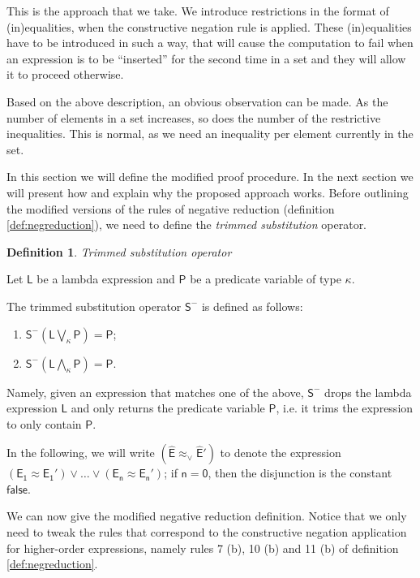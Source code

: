 \documentclass[inscr,ack,preface]{dithesis}
\theoremstyle{definition}
\newtheorem{definition}{Definition}[]
\newcommand{\msf}[1]{$\mathsf{#1}$}
\begin{document}
This is the approach that we take. We introduce restrictions in the format of (in)equalities, when the constructive negation rule is applied. These (in)equalities have to be introduced in such a way, that will cause the computation to fail when an expression is to be ``inserted'' for the second time in a set and they will allow it to proceed otherwise.

Based on the above description, an obvious observation can be made. As the number of elements in a set increases, so does the number of the restrictive inequalities. This is normal, as we need an inequality per element currently in the set.

In this section we will define the modified proof procedure. In the next section we will present how and explain why the proposed approach works. Before outlining the modified versions of the rules of negative reduction (definition \ref{def:negreduction}), we need to define the \emph{trimmed substitution} operator.

\begin{definition}{\emph{Trimmed substitution operator}}
\label{def:trimmedsub}

Let \msf{L} be a lambda expression and \msf{P} be a predicate variable of type $\kappa$.

The trimmed substitution operator \msf{S^{-}} is defined as follows:
\begin{enumerate}
  \item \msf{S^{-}\left( L \bigvee_{\kappa} P \right) = P };
  \item \msf{S^{-}\left( L \bigwedge_{\kappa} P \right) = P }.
\end{enumerate}

Namely, given an expression that matches one of the above, \msf{S^{-}} drops the lambda expression \msf{L} and only returns the predicate variable \msf{P}, i.e. it trims the expression to only contain \msf{P}.
\end{definition}

In the following, we will write \msf{\left( \widehat{E} \approx_{\lor} \widehat{E}' \right)} to denote the expression \msf{ \left( E_{1} \approx E_{1}' \right) \lor \dots \lor \left( E_{n} \approx E_{n}' \right)}; if \msf{n=0}, then the disjunction is the constant \msf{false}.

We can now give the modified negative reduction definition. Notice that we only need to tweak the rules that correspond to the constructive negation application for higher-order expressions, namely rules 7 (b), 10 (b) and 11 (b) of definition \ref{def:negreduction}.
\end{document}

